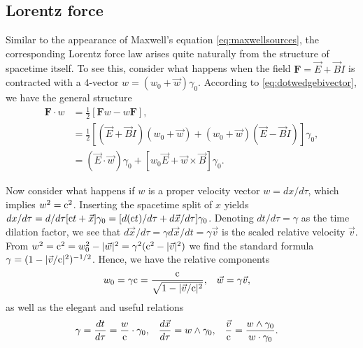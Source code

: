\documentclass[1p,sort&compress]{elsarticle}
\numberwithin{equation}{section}
\newcommand{\rv}[1]{\vec{#1}}
\newcommand{\bv}[1]{\mathbf{#1}}
\newcommand{\cc}{{\rm c}}
\begin{document}

\subsection{Lorentz force}


Similar to the appearance of Maxwell's equation \eqref{eq:maxwellsources}, the corresponding Lorentz force law arises quite naturally from the structure of spacetime itself.  To see this, consider what happens when the field $\bv{F} = \rv{E} + \rv{B}I$ is contracted with a 4-vector $w = (w_0 + \rv{w})\gamma_0$.  According to \eqref{eq:dotwedgebivector}, we have the general structure
\begin{align}\label{eq:fieldvectorcontraction}
  \bv{F}\cdot w &= \frac{1}{2}[\bv{F}w - w\bv{F}], \\
  &= \frac{1}{2}[(\rv{E} + \rv{B}I)(w_0 + \rv{w}) + (w_0 + \rv{w})(\rv{E} - \rv{B}I)]\gamma_0, \nonumber \\
  &= (\rv{E}\cdot\rv{w})\gamma_0 + [w_0\rv{E} + \rv{w}\times\rv{B}]\gamma_0. \nonumber 
\end{align}

Now consider what happens if $w$ is a proper velocity vector $w = dx/d\tau$, which implies $w^2 = \cc^2$.  Inserting the spacetime split of $x$ yields $dx/d\tau = d/d\tau[\cc t + \rv{x}]\gamma_0 = [d(\cc t)/d\tau + d\rv{x}/d\tau]\gamma_0$.  Denoting $dt/d\tau = \gamma$ as the time dilation factor, we see that $d\rv{x}/d\tau = \gamma d\rv{x}/dt = \gamma \rv{v}$ is the scaled relative velocity $\rv{v}$.  From $w^2 = \cc^2 = w_0^2 - |\rv{w}|^2 = \gamma^2(\cc^2-|\rv{v}|^2)$ we find the standard formula $\gamma = (1-|\rv{v}/\cc|^2)^{-1/2}$.  Hence, we have the relative components
\begin{align}\label{eq:fourvelocity}
  w_0 &= \gamma \cc = \frac{\cc}{\sqrt{1-|\rv{v}/\cc|^2}}, & \rv{w} &= \gamma \rv{v},
\end{align}
as well as the elegant and useful relations \cite{Doran2007}
\begin{align}
  \gamma &= \frac{dt}{d\tau} = \frac{w}{\cc}\cdot\gamma_0, & \frac{d\rv{x}}{d\tau} &= w\wedge\gamma_0, & \frac{\rv{v}}{\cc} &= \frac{w\wedge\gamma_0}{w\cdot\gamma_0}.
\end{align}
\end{document}
